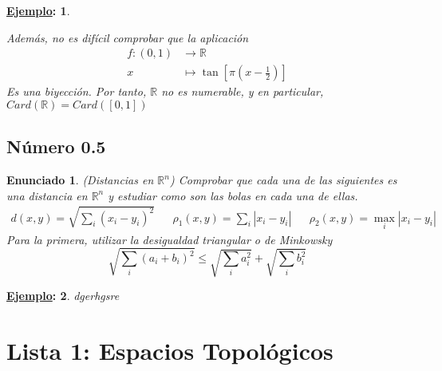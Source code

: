 \documentclass[10pt,a4paper,openright]{book}
\theoremstyle{break}
\newtheorem*{enun}{Enunciado}
\newtheorem*{ej}{\underline{Ejemplo}:}
\begin{document}
\begin{ej}
\begin{enumerate}[label={(\arabic*)}]
Además, no es difícil comprobar que la aplicación 
\begin{align*}
f: (0,1) &\rightarrow \mathbb{R} \\
x &\mapsto \tan\left[\pi (x - \frac{1}{2})\right]
\end{align*}
Es una biyección. Por tanto, $\mathbb{R}$ no es numerable, y en particular, $Card(\mathbb{R}) = Card([0,1])$
\end{enumerate}

\end{ej}

\section{Número 0.5}
\begin{enun}
(Distancias en $\mathbb{R}^n$) Comprobar que cada una de las siguientes es una distancia en $\mathbb{R}^n$ y estudiar como son las bolas en cada una de ellas.
\begin{align*}
d(x,y) = \sqrt{\sum_i (x_i - y_i)^2} && \rho_1(x,y) = \sum_i | x_i - y_i| && \rho_2 (x,y) = \max_i |x_i -y_i|
\end{align*}
Para la primera, utilizar la \textit{desigualdad triangular} o \textit{de Minkowsky} $$\sqrt{\sum_i (a_i + b_i)^2} \leq \sqrt{\sum_i a_i^2} + \sqrt{\sum_i b_i^2}$$
\end{enun}
\begin{ej}
dgerhgsre
\end{ej}
\chapter{Lista 1: Espacios Topológicos}%
\label{cha:lista1}
\end{document}
